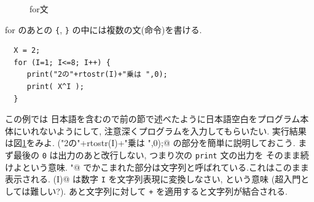 \documentclass{jbook}
\begin{document}
\begin{figure}[tbh]
\begin{center}
\end{center}
\caption{for文} \label{fig:powerOf2For2}
\end{figure}
for のあとの {\tt \{}, {\tt \}} の中には複数の文(命令)を書ける.
\begin{screen}
\begin{verbatim}
  X = 2;
  for (I=1; I<=8; I++) {
     print("2の"+rtostr(I)+"乗は ",0);
     print( X^I );
  }
\end{verbatim}
\end{screen}
この例では  
日本語を含むので前の節で述べたように日本語空白をプログラム本体にいれないようにして,
注意深くプログラムを入力してもらいたい.  
実行結果は図\ref{fig:powerOf2For2}をみよ. 
\verb@print("2の"+rtostr(I)+"乗は ",0);@ の部分を簡単に説明しておこう.
まず最後の {\tt 0} は出力のあと改行しない, つまり次の {\tt print} 文の出力を
そのまま続けよという意味.    
\verb@"@ でかこまれた部分は文字列と呼ばれている.これはこのまま表示される.
\verb@rtostr(I)@ は数字 {\tt I} を文字列表現に変換しなさい, という意味
(超入門としては難しい?).
あと文字列に対して {\tt +} を適用すると文字列が結合される.
\end{document}
